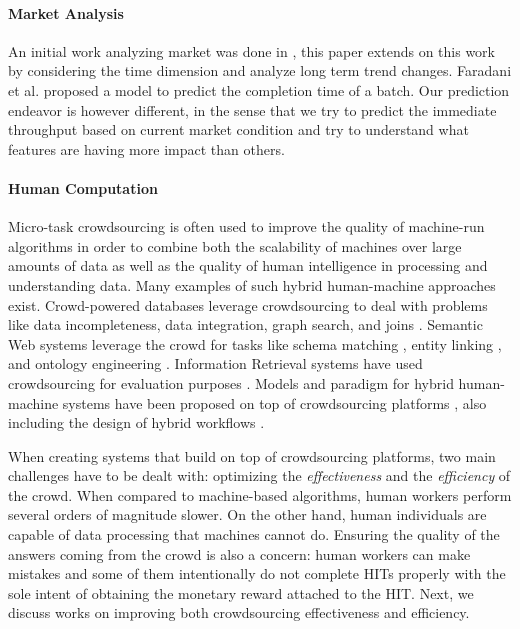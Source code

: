 \paragraph{Market Analysis}
An initial work analyzing \amt{} market was done in \cite{mturk}, this paper extends on this work by considering the time dimension and analyze long term trend changes.
Faradani et al. \cite{faradani2011s} proposed a model to predict the completion time of a batch. Our prediction endeavor is however different, in the sense that we try to predict the immediate throughput based on current market condition and try to understand what features are having more impact than others.

\paragraph{Human Computation}
Micro-task crowdsourcing is often used to improve the quality of machine-run algorithms in order to combine both the scalability of machines over large amounts of data as well as the quality of human intelligence in processing and understanding data.
Many examples of such hybrid human-machine approaches exist.
% 
Crowd-powered databases \cite{crowddb} leverage crowdsourcing to deal with problems like  data incompleteness,  data integration, graph search, and joins \cite{crowder,graphsearch,crowdjoins}.
% 
Semantic Web systems leverage the crowd for tasks like schema matching \cite{crowdmap}, entity linking \cite{zencrowd}, and ontology engineering \cite{bioonto}.
% 
Information Retrieval systems have used crowdsourcing for evaluation purposes \cite{mizzaroalonso}.
% 
Models and paradigm for hybrid human-machine systems have been proposed on top of crowdsourcing platforms \cite{crowdcomputer}, also including the design of hybrid workflows \cite{workflows}.

When creating systems that build on top of crowdsourcing platforms, two main challenges have to be dealt with: optimizing the \emph{effectiveness} and the \emph{efficiency}  of the crowd. When compared to machine-based algorithms, human workers perform several orders of magnitude slower. On the other hand, human individuals are capable of data processing that machines cannot do. Ensuring the quality of the answers coming from the crowd is also a concern: human workers can make mistakes and some of them intentionally do not complete HITs properly with the sole intent of obtaining the monetary reward attached to the HIT. Next, we discuss works on improving both crowdsourcing effectiveness and efficiency.





